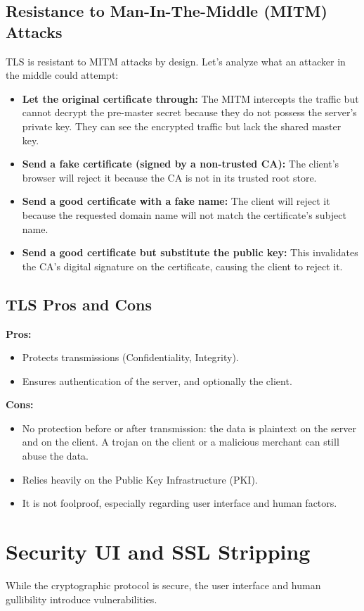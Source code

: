 \subsection{Resistance to Man-In-The-Middle (MITM) Attacks}
TLS is resistant to MITM attacks by design. Let's analyze what an attacker in the middle could attempt:
\begin{itemize}
    \item \textbf{Let the original certificate through:} The MITM intercepts the traffic but cannot decrypt the pre-master secret because they do not possess the server's private key. They can see the encrypted traffic but lack the shared master key.
    \item \textbf{Send a fake certificate (signed by a non-trusted CA):} The client's browser will reject it because the CA is not in its trusted root store.
    \item \textbf{Send a good certificate with a fake name:} The client will reject it because the requested domain name will not match the certificate's subject name.
    \item \textbf{Send a good certificate but substitute the public key:} This invalidates the CA's digital signature on the certificate, causing the client to reject it.
\end{itemize}

\subsection{TLS Pros and Cons}
\textbf{Pros:}
\begin{itemize}
    \item Protects transmissions (Confidentiality, Integrity).
    \item Ensures authentication of the server, and optionally the client.
\end{itemize}
\textbf{Cons:}
\begin{itemize}
    \item No protection before or after transmission: the data is plaintext on the server and on the client. A trojan on the client or a malicious merchant can still abuse the data.
    \item Relies heavily on the Public Key Infrastructure (PKI).
    \item It is not foolproof, especially regarding user interface and human factors.
\end{itemize}

\section{Security UI and SSL Stripping}
While the cryptographic protocol is secure, the user interface and human gullibility introduce vulnerabilities. 

